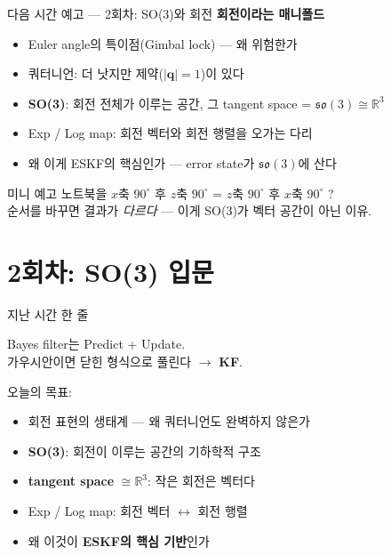 \begin{frame}{다음 시간 예고 — 2회차: SO(3)와 회전}
  \textbf{회전이라는 매니폴드}
  \begin{itemize}
    \item Euler angle의 특이점(Gimbal lock) — 왜 위험한가
    \item 쿼터니언: 더 낫지만 제약($|\mathbf{q}|=1$)이 있다
    \item \textbf{SO(3)}: 회전 전체가 이루는 공간, 그 tangent space = $\mathfrak{so}(3) \cong \mathbb{R}^3$
    \item Exp / Log map: 회전 벡터와 회전 행렬을 오가는 다리
    \item 왜 이게 ESKF의 핵심인가 — error state가 $\mathfrak{so}(3)$에 산다
  \end{itemize}
  \vspace{0.5em}
  \begin{block}{미니 예고}
    노트북을 $x$축 $90^\circ$ 후 $z$축 $90^\circ$ = $z$축 $90^\circ$ 후 $x$축 $90^\circ$ ?\\
    순서를 바꾸면 결과가 \emph{다르다} — 이게 SO(3)가 벡터 공간이 아닌 이유.
  \end{block}
\end{frame}

\section{2회차: SO(3) 입문}


\begin{frame}{지난 시간 한 줄}
  \begin{center}
    \large
    Bayes filter는 Predict + Update. \\
    가우시안이면 닫힌 형식으로 풀린다 $\rightarrow$ \textbf{KF}.
  \end{center}
  \vspace{0.5em}
  오늘의 목표:
  \begin{itemize}
    \item 회전 표현의 생태계 — 왜 쿼터니언도 완벽하지 않은가
    \item \textbf{SO(3)}: 회전이 이루는 공간의 기하학적 구조
    \item \textbf{tangent space} $\cong \mathbb{R}^3$: 작은 회전은 벡터다
    \item Exp / Log map: 회전 벡터 $\leftrightarrow$ 회전 행렬
    \item 왜 이것이 \textbf{ESKF의 핵심 기반}인가
  \end{itemize}
\end{frame}

